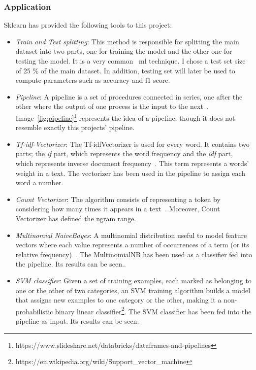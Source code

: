 \subsubsection{Application}
Sklearn has provided the following tools to this project:
\begin{itemize}
    \item \textit{Train and Test splitting}: This method is responsible for splitting the main dataset into two parts, one for training the model and the other one for testing the model. It is a very common ~\ac{ml} technique. I chose a test set size of 25 \% of the main dataset. In addition, testing set will later be used to compute parameters such as accuracy and f1 score.
    \item \textit{Pipeline}: A pipeline is a set of procedures connected in series, one after the other where the output of one process is the input to the next~\cite{pipeline1}. Image~\ref{fig:pipeline}\footnote{https://www.slideshare.net/databricks/dataframes-and-pipelines} represents the idea of a pipeline, though it does not resemble exactly this projects' pipeline.
    \item \textit{Tf-idf-Vectorizer}: The Tf-idfVectorizer is used for every word. It contains two parts; the \textit{if} part, which represents the word frequency and the \textit{idf} part, which represents inverse document frequency~\cite{tfidf1}. This term represents a words' weight in a text. The vectorizer has been used in the pipeline to assign each word a number. 
    \item \textit{Count Vectorizer}: The algorithm consists of representing a token by considering how many times it appears in a text~\cite{countvect1}. Moreover, Count Vectorizer has defined the ngram range.
    \item \textit{Multinomial NaiveBayes}: A multinomial distribution useful to model feature vectors where each value represents a number of occurrences of a term (or its relative frequency)~\cite{countvect1}. The MultinomialNB has been used as a classifier fed into the pipeline. Its results can be seen..
    \item \textit{SVM classifier}: Given a set of training examples, each marked as belonging to one or the other of two categories, an SVM training algorithm builds a model that assigns new examples to one category or the other, making it a non-probabilistic binary linear classifier\footnote{https://en.wikipedia.org/wiki/Support_vector_machine}. The SVM classifier has been  fed into the pipeline as input. Its results can be seen.

\end{itemize}
